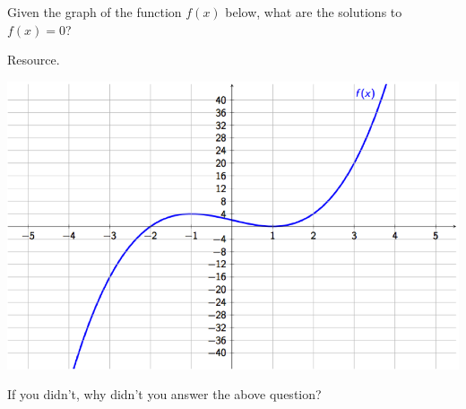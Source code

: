 \documentclass{ximera}
\begin{document}
\begin{problem} 
    Given the graph of the function $f(x)$ below, what are the solutions to $f(x) = 0$?
    
    \begin{hint}
    Resource.
    \end{hint}
       
\begin{center} \includegraphics[scale=0.7]{Graphing1.png} \end{center}
    
  \begin{multipleChoice}
  \end{multipleChoice}
  
  If you didn't, why didn't you answer the above question?
  
  \begin{multipleChoice}
  \end{multipleChoice}
\end{problem}
\end{document}
